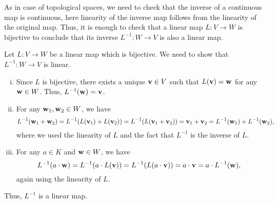 \begin{remark}
    As in case of topological spaces, we need to check that the inverse of a continuous map is continuous, here linearity of the inverse map follows from the linearity of the original map. Thus, it is enough to check that a linear map \(L: V \to W\) is bijective to conclude that its inverse \(L^{-1}: W \to V\) is also a linear map.

    \begin{Proof}
        Let \(L: V \to W\) be a linear map which is bijective. We need to show that \(L^{-1}: W \to V\) is linear.
        \begin{enumerate}[(i)]
            \item Since \(L\) is bijective, there exists a unique \(\vb{v} \in V\) such that \(L(\vb{v}) = \vb{w}\) for any \(\vb{w} \in W\). Thus, \(L^{-1}(\vb{w}) = \vb{v}\).
            \item For any \(\vb{w}_1, \vb{w}_2 \in W\), we have
                  \[
                      L^{-1}(\vb{w}_1 + \vb{w}_2) = L^{-1}(L(\vb{v}_1) + L(\vb{v}_2)) = L^{-1}(L(\vb{v}_1 + \vb{v}_2)) = \vb{v}_1 + \vb{v}_2 = L^{-1}(\vb{w}_1) + L^{-1}(\vb{w}_2),
                  \]
                  where we used the linearity of \(L\) and the fact that \(L^{-1}\) is the inverse of \(L\).
            \item For any \(a \in K\) and \(\vb{w} \in W\), we have
                  \[
                      L^{-1}(a \cdot \vb{w}) = L^{-1}(a \cdot L(\vb{v})) = L^{-1}(L(a \cdot \vb{v})) = a \cdot \vb{v} = a \cdot L^{-1}(\vb{w}),
                  \]
                  again using the linearity of \(L\).
        \end{enumerate}
        Thus, \(L^{-1}\) is a linear map.
    \end{Proof}
\end{remark}

